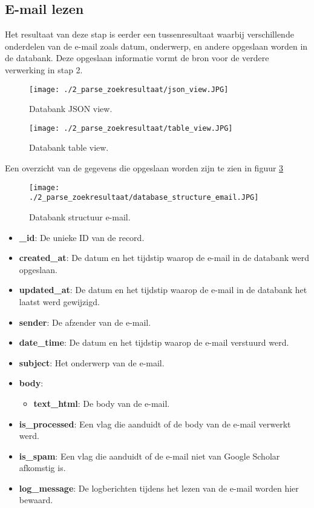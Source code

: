 \subsection{E-mail lezen}
Het resultaat van deze stap is eerder een tussenresultaat waarbij verschillende onderdelen van de e-mail zoals datum, onderwerp, en andere opgeslaan worden in de databank. Deze opgeslaan informatie vormt de bron voor de verdere verwerking in stap 2.
\begin{figure}
    \centering
    \texttt{[image: ./2\_parse\_zoekresultaat/json\_view.JPG]}
    \caption[Databank JSON view.]{\label{fig:Databank JSON view}Databank JSON view.}
\end{figure}
\begin{figure}
    \centering
    \texttt{[image: ./2\_parse\_zoekresultaat/table\_view.JPG]}
    \caption[Databank table view.]{\label{fig:Databank table view}Databank table view.}
\end{figure}
\FloatBarrier
Een overzicht van de gegevens die opgeslaan worden zijn te zien in figuur \ref{fig:databank_structuur_email}
\begin{figure}
    \centering
    \texttt{[image: ./2\_parse\_zoekresultaat/database\_structure\_email.JPG]}
    \caption[Databank structuur e-mail.]{\label{fig:databank_structuur_email}Databank structuur e-mail.}
\end{figure}
\begin{itemize}
    \item \textbf{\_id}: De unieke ID van de record.
    \item \textbf{created\_at}: De datum en het tijdstip waarop de e-mail in de databank werd opgeslaan.
    \item \textbf{updated\_at}: De datum en het tijdstip waarop de e-mail in de databank het laatst werd gewijzigd. 
    \item \textbf{sender}: De afzender van de e-mail.
    \item \textbf{date\_time}: De datum en het tijdstip waarop de e-mail verstuurd werd.
    \item \textbf{subject}: Het onderwerp van de e-mail. 
    \item \textbf{body}: 
        \begin{itemize}
            \item \textbf{text\_html}: De body van de e-mail.
        \end{itemize}
    \item \textbf{is\_processed}: Een vlag die aanduidt of de body van de e-mail verwerkt werd.
    \item \textbf{is\_spam}: Een vlag die aanduidt of de e-mail niet van Google Scholar afkomstig is. 
    \item \textbf{log\_message}: De logberichten tijdens het lezen van de e-mail worden hier bewaard. 
\end{itemize}
\FloatBarrier
